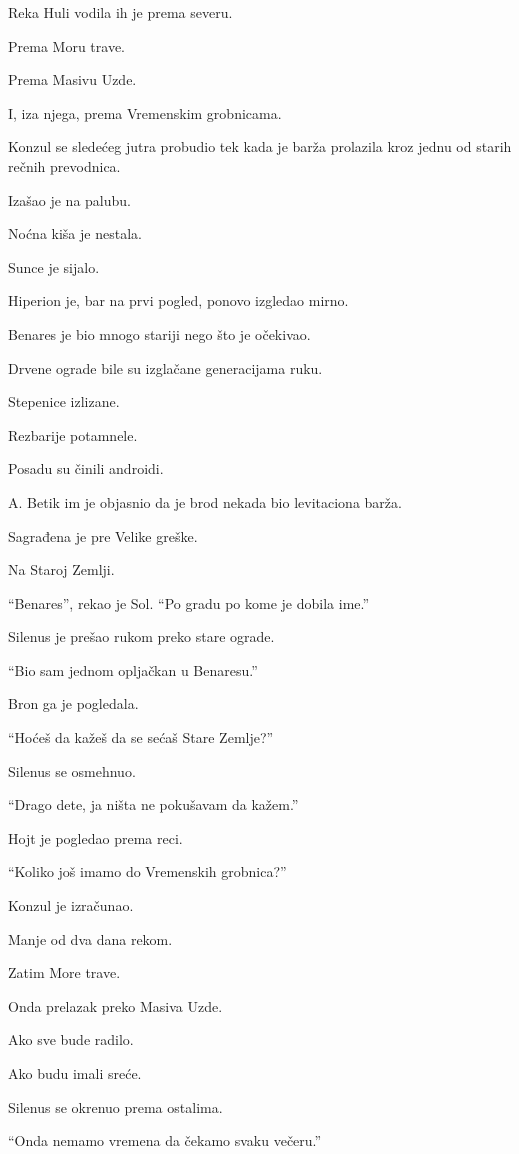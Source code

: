 Reka Huli vodila ih je prema severu.

Prema Moru trave.

Prema Masivu Uzde.

I, iza njega, prema Vremenskim grobnicama.

\bigskip

Konzul se sledećeg jutra probudio tek kada je barža prolazila kroz jednu od starih rečnih prevodnica.

Izašao je na palubu.

Noćna kiša je nestala.

Sunce je sijalo.

Hiperion je, bar na prvi pogled, ponovo izgledao mirno.

Benares je bio mnogo stariji nego što je očekivao.

Drvene ograde bile su izglačane generacijama ruku.

Stepenice izlizane.

Rezbarije potamnele.

Posadu su činili androidi.

A. Betik im je objasnio da je brod nekada bio levitaciona barža.

Sagrađena je pre Velike greške.

Na Staroj Zemlji.

``Benares'', rekao je Sol. ``Po gradu po kome je dobila ime.''

Silenus je prešao rukom preko stare ograde.

``Bio sam jednom opljačkan u Benaresu.''

Bron ga je pogledala.

``Hoćeš da kažeš da se sećaš Stare Zemlje?''

Silenus se osmehnuo.

``Drago dete, ja ništa ne pokušavam da kažem.''

Hojt je pogledao prema reci.

``Koliko još imamo do Vremenskih grobnica?''

Konzul je izračunao.

Manje od dva dana rekom.

Zatim More trave.

Onda prelazak preko Masiva Uzde.

Ako sve bude radilo.

Ako budu imali sreće.

Silenus se okrenuo prema ostalima.

``Onda nemamo vremena da čekamo svaku večeru.''

